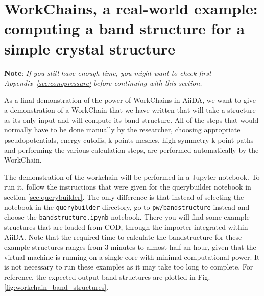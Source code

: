 
\section{\label{sec:workchain_demonstration}WorkChains, a real-world example: computing a band structure for a simple crystal structure}

\textbf{Note}: \emph{If you still have enough time, you might want to check first Appendix~\ref{sec:convpressure} before continuing with this section.}

As a final demonstration of the power of WorkChains in AiiDA, we want to give a demonstration of a WorkChain that we have written that will take a structure as its only input and will compute its band structure.
All of the steps that would normally have to be done manually by the researcher, choosing appropriate pseudopotentials, energy cutoffs, k-points meshes, high-symmetry k-point paths and performing the various calculation steps, are performed automatically by the WorkChain.

The demonstration of the workchain will be performed in a Jupyter notebook.
To run it, follow the instructions that were given for the querybuilder notebook in section \ref{sec:querybuilder}.
The only difference is that instead of selecting the notebook in the \texttt{querybuilder} directory, go to \texttt{pw/bandstructure} instead and choose the \texttt{bandstructure.ipynb} notebook.
There you will find some example structures that are loaded from COD, through the importer integrated within AiiDA.
Note that the required time to calculate the bandstructure for these example structures ranges from 3 minutes to almost half an hour, given that the virtual machine is running on a single core with minimal computational power.
It is not necessary to run these examples as it may take too long to complete.
For reference, the expected output band structures are plotted in Fig.\,\ref{fig:workchain_band_structures}.

